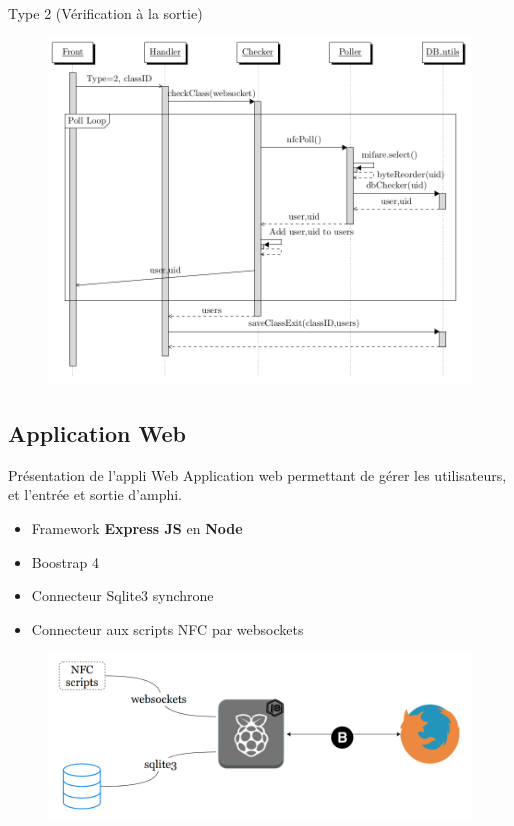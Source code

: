 \documentclass[aspectratio=169]{beamer}
\begin{document}
\begin{frame}{Type 2 (Vérification à la sortie)}
  \begin{figure}[]
    \includegraphics[height=.9\textheight]{../assets/nfcSeqExit.png}
  \end{figure}
\end{frame}

\subsection{Application Web}

\begin{frame}{Présentation de l'appli Web}
  Application web permettant de gérer les utilisateurs, et l'entrée et sortie d'amphi.
  \begin{itemize}
    \item Framework \textbf{Express JS} en \textbf{Node}
    \item Boostrap 4
    \item Connecteur Sqlite3 synchrone
    \item Connecteur aux scripts NFC par websockets
  \end{itemize}

  \begin{figure}
    \centering
    \includegraphics[width=.5\textwidth]{../assets/web_architecture.png}
  \end{figure}
\end{frame}
\end{document}
